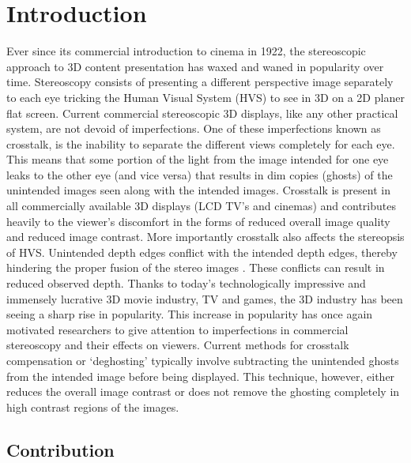 \chapter{Introduction}
\label{chap:intro}

Ever since its commercial introduction to cinema in 1922, the stereoscopic approach to 3D content presentation has waxed and waned in popularity over time. Stereoscopy consists of presenting a different perspective image separately to each eye tricking the Human Visual System (HVS) to see in 3D on a 2D planer flat screen. Current commercial stereoscopic 3D displays, like any other practical system, are not devoid of imperfections. One of these imperfections known as crosstalk, is the inability to separate the different views completely for each eye. This means that some portion of the light from the image intended for one eye leaks to the other eye (and vice versa) that results in dim copies (ghosts) of the unintended images seen along with the intended images. Crosstalk is present in all commercially available 3D displays (LCD TV's and cinemas) and contributes heavily to the viewer's discomfort in the forms of reduced overall image quality and reduced image contrast. More importantly crosstalk also affects the stereopsis of HVS. Unintended depth edges conflict with the intended depth edges, thereby hindering the proper fusion of the stereo images \cite{tsirlin2012effect}. These conflicts can result in reduced observed depth. Thanks to today's technologically impressive and immensely lucrative 3D movie industry, TV and games, the 3D industry has been seeing a sharp rise in popularity. This increase in popularity has once again motivated researchers to give attention to imperfections in commercial stereoscopy and their effects on viewers. Current methods for crosstalk compensation or `deghosting' typically involve subtracting the unintended ghosts from the intended image before being displayed. This technique, however, either reduces the overall image contrast or does not remove the ghosting completely in high contrast regions of the images.


\section{Contribution}


